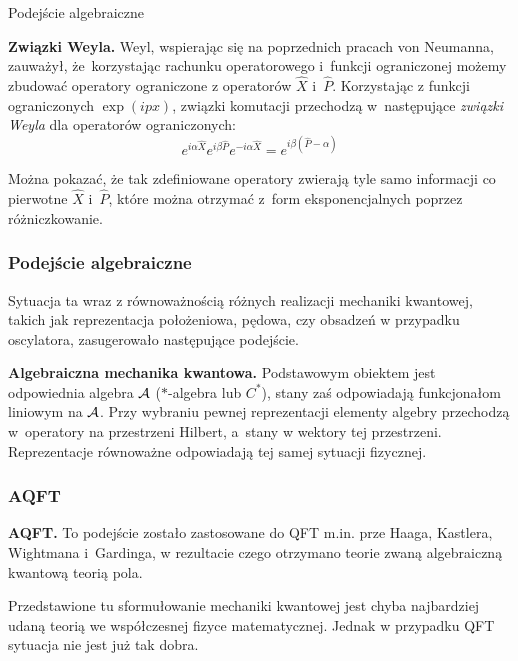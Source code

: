 \documentclass[10pt,t]{beamer}
\begin{document}
\begin{frame}{Podejście algebraiczne}


  \textbf{Związki Weyla.}
  Weyl, wspierając się na poprzednich pracach von Neumanna, zauważył,
  że~korzystając rachunku operatorowego i~funkcji ograniczonej możemy
  zbudować operatory ograniczone z operatorów $\widehat{ X }$
  i~$\widehat{ P }$. Korzystając z funkcji ograniczonych $\exp( i p x )$,
  związki komutacji przechodzą w~następujące \textit{związki Weyla} dla
  operatorów ograniczonych:
  \begin{equation}
    \label{eq:Matematyczna-strona-06}
    e^{ i \alpha \widehat{ X } } e^{ i \beta \widehat{ P } }
    e^{ -i \alpha \widehat{ X } }
    = e^{ i \beta ( \widehat{ P } - \alpha) }
  \end{equation}

  Można pokazać, że tak zdefiniowane operatory zwierają tyle samo informacji
  co pierwotne $\widehat{ X }$ i~$\widehat{ P }$, które można otrzymać z~form
  eksponencjalnych poprzez różniczkowanie.

\end{frame}





\begin{frame}
  \frametitle{Podejście algebraiczne}


  Sytuacja ta wraz z równoważnością różnych realizacji mechaniki kwantowej,
  takich jak reprezentacja położeniowa, pędowa, czy obsadzeń w przypadku
  oscylatora, zasugerowało następujące podejście.


  \textbf{Algebraiczna mechanika kwantowa.}
  Podstawowym obiektem jest odpowiednia algebra $\mathcal{A}$ ($*$-algebra lub
  $C^{*}$), stany zaś odpowiadają funkcjonałom liniowym na $\mathcal{A}$. Przy
  wybraniu pewnej reprezentacji elementy algebry przechodzą w~operatory na
  przestrzeni Hilbert, a~stany w wektory tej przestrzeni. Reprezentacje
  równoważne odpowiadają tej samej sytuacji fizycznej.

\end{frame}





\begin{frame}
  \frametitle{AQFT}


  \textbf{AQFT.}
  To podejście zostało zastosowane do QFT m.in. prze Haaga, Kastlera,
  Wightmana i~Gardinga, w rezultacie czego otrzymano teorie zwaną
  algebraiczną kwantową teorią pola.

  Przedstawione tu sformułowanie mechaniki kwantowej jest chyba najbardziej
  udaną teorią we współczesnej fizyce matematycznej. Jednak w przypadku QFT
  sytuacja nie jest już tak dobra.

\end{frame}
\end{document}
